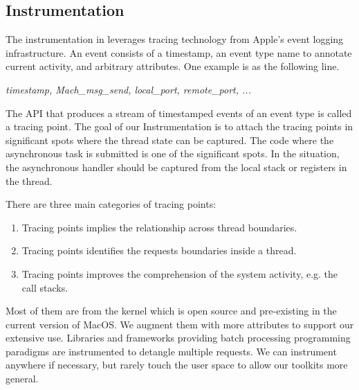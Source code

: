 

\subsection{Instrumentation}
The instrumentation in \xxx leverages tracing technology from Apple's event logging infrastructure.
An event consists of a timestamp, an event type name to annotate current activity, and arbitrary attributes.
One example is as the following line.

\textit{timestamp, Mach\_msg\_send, local\_port, remote\_port, ...}

The API that produces a stream of timestamped events of an event type is called a tracing point.
The goal of our Instrumentation is to attach the tracing points in significant spots where the thread state can be captured.
The code where the asynchronous task is submitted is one of the significant spots.
In the situation, the asynchronous handler should be captured from the local stack or registers in the thread.

There are three main categories of tracing points:
\begin{enumerate}
	\item Tracing points implies the relationship across thread boundaries.
	\item Tracing points identifies the requests boundaries inside a thread.
	\item Tracing points improves the comprehension of the system activity, e.g. the call stacks.
\end{enumerate}

Most of them are from the kernel which is open source and pre-existing in the current version of MacOS.
We augment them with more attributes to support our extensive use.
Libraries and frameworks providing batch processing programming paradigms are instrumented to detangle multiple requests.
We can instrument anywhere if necessary, but rarely touch the user space to allow our toolkits more general.

